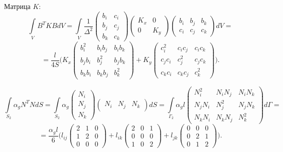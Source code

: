 \documentclass[a4paper, 12pt]{article}
\begin{document}
\begin{enumerate}
Матрица \( K \):
\[
\int\limits_V B^T K B dV = \int\limits_V \frac{1}{\Delta^2} 
\begin{pmatrix}
b_i & c_i \\
b_j & c_j \\
b_k & c_k
\end{pmatrix}
\begin{pmatrix}
K_x & 0 \\
0 & K_y
\end{pmatrix}
\begin{pmatrix}
b_i & b_j & b_k \\
c_i & c_j & c_k
\end{pmatrix}
dV =
\]
\[
= \frac{l}{4S} \Bigg(
K_x 
\begin{pmatrix}
b_i^2 & b_i b_j & b_i b_k \\
b_j b_i & b_j^2 & b_j b_k \\
b_k b_i & b_k b_j & b_k^2
\end{pmatrix}
+ K_y 
\begin{pmatrix}
c_i^2 & c_i c_j & c_i c_k \\
c_j c_i & c_j^2 & c_j c_k \\
c_k c_i & c_k c_j & c_k^2
\end{pmatrix}
\Bigg).
\]

\[
\int\limits_{S_2} \alpha_g N^T N dS = \int\limits_{S_2} \alpha_g 
\begin{pmatrix}
N_i \\
N_j \\
N_k
\end{pmatrix}
\begin{pmatrix}
N_i & N_j & N_k
\end{pmatrix}
dS = \int\limits_{\Gamma_2} \alpha_g l 
\begin{pmatrix}
N_i^2 & N_i N_j & N_i N_k \\
N_j N_i & N_j^2 & N_j N_k \\
N_k N_i & N_k N_j & N_k^2
\end{pmatrix}
d\Gamma =
\]
\[
= \frac{\alpha_g l}{6}
\Bigg(
l_{ij} 
\begin{pmatrix}
2 & 1 & 0 \\
1 & 2 & 0 \\
0 & 0 & 0
\end{pmatrix}
+ l_{ik}
\begin{pmatrix}
2 & 0 & 1 \\
0 & 0 & 0 \\
1 & 0 & 2
\end{pmatrix}
+ l_{jk}
\begin{pmatrix}
0 & 0 & 0 \\
0 & 2 & 1 \\
0 & 1 & 2
\end{pmatrix}
\Bigg).
\]


\end{enumerate}
\end{document}
